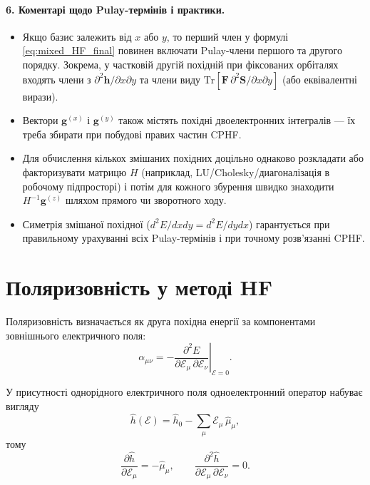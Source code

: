 \documentclass{PySCFBook}
\begin{document}
\paragraph{6. Коментарі щодо Pulay-термінів і практики.}
\begin{itemize}
  \item Якщо базис залежить від $x$ або $y$, то перший член у формулі \eqref{eq:mixed_HF_final} повинен включати Pulay-члени першого та другого порядку. Зокрема, у частковій другій похідній при фіксованих орбіталях входять члени з $\partial^2\mathbf h/\partial x\partial y$ та члени виду $\mathrm{Tr}[\mathbf F\,\partial^2\mathbf S/\partial x\partial y]$ (або еквівалентні вирази).
  \item Вектори $\mathbf g^{(x)}$ і $\mathbf g^{(y)}$ також містять похідні двоелектронних інтегралів — їх треба збирати при побудові правих частин CPHF.
  \item Для обчислення кількох змішаних похідних доцільно однаково розкладати або факторизувати матрицю $H$ (наприклад, LU/Cholesky/диагоналізація в робочому підпросторі) і потім для кожного збурення швидко знаходити $H^{-1}\mathbf g^{(z)}$ шляхом прямого чи зворотного ходу.
  \item Симетрія змішаної похідної ($d^2E/dxdy = d^2E/dydx$) гарантується при правильному урахуванні всіх Pulay-термінів і при точному розв'язанні CPHF.
\end{itemize}


\section{Поляризовність у методі HF}

Поляризовність визначається як друга похідна енергії за компонентами
зовнішнього електричного поля:
\begin{equation}\label{eq:alpha_def}
\alpha_{\mu\nu}
=
-\left.\frac{\partial^2 E}{\partial \mathcal E_\mu\,\partial \mathcal E_\nu}\right|_{\mathcal E = 0}.
\end{equation}

У присутності однорідного електричного поля одноелектронний оператор
набуває вигляду
\[
\hat h(\boldsymbol{\mathcal E})
=
\hat h_0 - \sum_{\mu} \mathcal E_\mu\,\hat\mu_\mu,
\]
тому
\[
\frac{\partial \hat h}{\partial \mathcal E_\mu} = -\hat\mu_\mu,
\qquad
\frac{\partial^2 \hat h}{\partial \mathcal E_\mu\,\partial \mathcal E_\nu}=0.
\]
\end{document}
